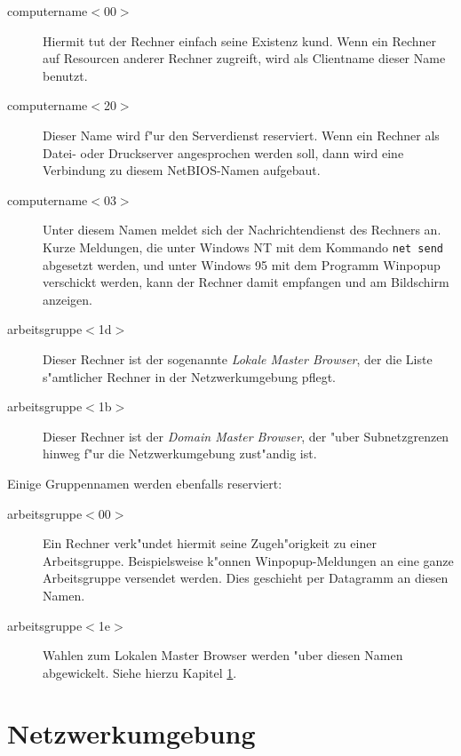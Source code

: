 \documentclass{scrartcl}
\newcommand{\prog}{\texttt}
\newcommand{\defin}{\emph}
\begin{document}
\begin{description}

\item[computername$<$00$>$] Hiermit tut der Rechner einfach seine
Existenz kund. Wenn ein Rechner auf Resourcen anderer Rechner zugreift,
wird als Clientname dieser Name benutzt.

\item[computername$<$20$>$] Dieser Name wird f"ur den Serverdienst
reserviert. Wenn ein Rechner als Datei- oder Druckserver angesprochen
werden soll, dann wird eine Verbindung zu diesem NetBIOS-Namen aufgebaut.

\item[computername$<$03$>$] Unter diesem Namen meldet sich der
Nachrichtendienst des Rechners an. Kurze Meldungen, die unter Windows
NT mit dem Kommando \prog{net send} abgesetzt werden, und unter
Windows 95 mit dem Programm Winpopup verschickt werden, kann der
Rechner damit empfangen und am Bildschirm anzeigen.

\item[arbeitsgruppe$<$1d$>$] Dieser Rechner ist der sogenannte
  \defin{Lokale Master Browser}, der die Liste s"amtlicher Rechner in
  der Netzwerkumgebung pflegt.
  
\item[arbeitsgruppe$<$1b$>$] Dieser Rechner ist der \defin{Domain
    Master Browser}, der "uber Subnetzgrenzen hinweg f"ur die
  Netzwerkumgebung zust"andig ist.

\end{description}

Einige Gruppennamen werden ebenfalls reserviert:

\begin{description}
  
\item[arbeitsgruppe$<$00$>$] Ein Rechner verk"undet hiermit seine
  Zugeh"origkeit zu einer Arbeitsgruppe. Beispielsweise k"onnen
  Winpopup-Meldungen an eine ganze Arbeitsgruppe versendet werden.
  Dies geschieht per Datagramm an diesen Namen.
  
\item[arbeitsgruppe$<$1e$>$] Wahlen zum Lokalen Master Browser werden
  "uber diesen Namen abgewickelt. Siehe hierzu Kapitel \ref{netzwerkumgebung}.

\end{description}

\section{Netzwerkumgebung}
\label{netzwerkumgebung}
\end{document}
